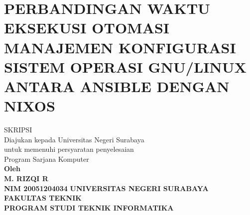 \documentclass[10pt,twoside]{report}
\begin{document}

\shipout\null
{}
\chapter*{PERBANDINGAN WAKTU EKSEKUSI OTOMASI MANAJEMEN
  KONFIGURASI SISTEM OPERASI GNU/LINUX ANTARA ANSIBLE DENGAN NIXOS}
\begin{center}
	\vspace{1cm}
	SKRIPSI \\
	\medskip
	Diajukan kepada Universitas Negeri Surabaya\\
	\medskip
	untuk memenuhi persyaratan penyelesaian\\
	\medskip
	Program Sarjana Komputer\\
	\vfill
	\textbf{Oleh \\
		\medskip
		M. RIZQI R \\
		\medskip
		NIM 20051204034}
	\vfill
	\textbf{UNIVERSITAS NEGERI SURABAYA\\
		\medskip
		FAKULTAS TEKNIK\\
		\medskip
		PROGRAM STUDI TEKNIK INFORMATIKA\\
		}
\end{center}
\end{document}
